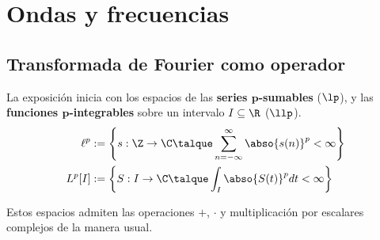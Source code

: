 
\chapter{Ondas y frecuencias}

\section{Transformada de Fourier como operador}

La exposición inicia con los espacios de las \textbf{series $\boldsymbol{p}$-sumables}
($\lp$), y las  \textbf{funciones $\boldsymbol{p}$-integrables} sobre un intervalo 
$I \subseteq \R$ ($\llp$).
%
\begin{align*}
\ell^{p} &:= \left\{ s: \Z\rightarrow\C \talque \sum_{n=-\infty}^{\infty} \abso{s(n)}^{p} < \infty \right\}
\\
L^{p}[I] &:= \left\{ S: I\rightarrow\C \talque \int_I \abso{S(t)}^{p} dt < \infty \right\}
\end{align*}

Estos espacios admiten las operaciones $+$, $\cdot$ y multiplicación por escalares complejos de la 
manera usual.%

%

